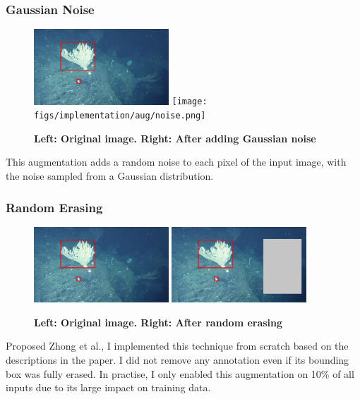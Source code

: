 \documentclass[12pt,a4paper,twoside,openany]{report}
\begin{document}
\subsubsection{Gaussian Noise}
\begin{figure}[H]
    \centering
    \includegraphics[width=0.45\textwidth]{figs/implementation/aug/before.png}
    \hfill
    \texttt{[image: figs/implementation/aug/noise.png]}
    \caption{\textbf{Left: Original image. Right: After adding Gaussian noise}}
    \label{fig:aug_noise}
\end{figure}
This augmentation adds a random noise to each pixel of the input image, with the noise sampled from a Gaussian distribution.

\subsubsection{Random Erasing}
\begin{figure}[H]
    \centering
    \includegraphics[width=0.45\textwidth]{figs/implementation/aug/before.png}
    \hfill
    \includegraphics[width=0.45\textwidth]{figs/implementation/aug/erase.png}
    \caption{\textbf{Left: Original image. Right: After random erasing}}
    \label{fig:aug_erase}
\end{figure}
Proposed Zhong et al.\cite{zhong_random_2017}, I implemented this technique from scratch based on the descriptions in the paper.
I did not remove any annotation even if its bounding box was fully erased.
In practise, I only enabled this augmentation on 10\% of all inputs due to its large impact on training data.
\end{document}
